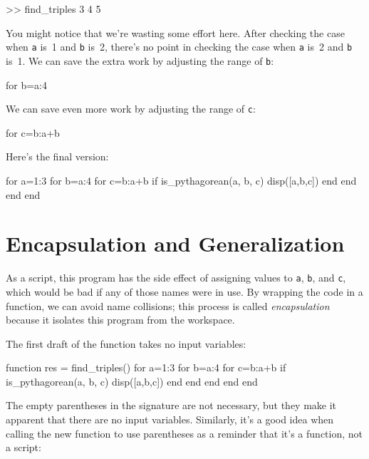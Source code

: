 \documentclass[../../book.tex]{subfiles}
\begin{document}
\begin{code}
>> find_triples
     3     4     5
\end{code}

You might notice that we're wasting some effort here.
After checking the case when \lstinline{a} is~1 and \lstinline{b} is~2, there's no point in checking
the case when \lstinline{a} is~2 and \lstinline{b} is~1.  We can save the extra work by adjusting the
range of \lstinline{b}:

\begin{code}
for b=a:4
\end{code}

We can save even more work by adjusting the range of \lstinline{c}:

\begin{code}
for c=b:a+b
\end{code}

Here's the final version:

\begin{code}
for a=1:3
    for b=a:4
        for c=b:a+b
            if is_pythagorean(a, b, c)
                disp([a,b,c])
            end
        end
    end
end
\end{code}

\section{Encapsulation and Generalization}

As a script, this program has the side effect of assigning values to
\lstinline{a}, \lstinline{b}, and \lstinline{c}, which would be bad if any of those names were in use.
By wrapping the code in a function, we can avoid name collisions; this process is called \emph{encapsulation} because it isolates this program from the workspace.


The first draft of the function takes no input variables:

\begin{code}
function res = find_triples()
    for a=1:3
        for b=a:4
            for c=b:a+b
                if is_pythagorean(a, b, c)
                    disp([a,b,c])
                end
            end
        end
    end
end
\end{code}

The empty parentheses in the signature are not necessary, but
they make it apparent that there are no input variables.  Similarly,
it's a good  idea when calling the new function to use parentheses as a reminder
that it's a function, not a script:
\end{document}
